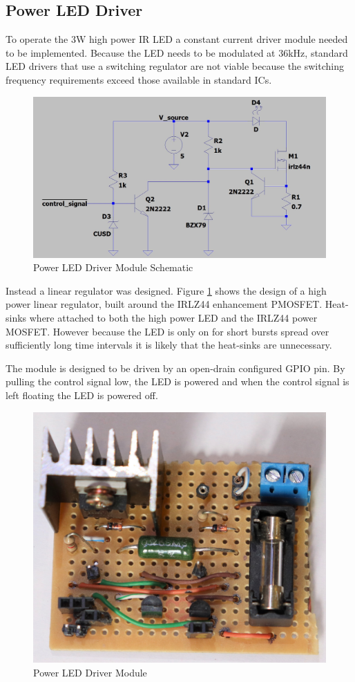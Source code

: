 \subsection{Power LED Driver}

To operate the 3W high power IR LED a constant current driver module needed to be implemented. Because the LED needs to be modulated at 36kHz, standard LED drivers that use a switching regulator are not viable because the switching frequency requirements exceed those available in standard ICs.

\begin{figure}[H]
	\centering
	\includegraphics[width=.8\textwidth]{figures/design/power_led_driver.JPG}
	\caption{Power LED Driver Module Schematic}
	\label{fig:schematic_power_led_driver}
\end{figure}

Instead a linear regulator was designed. Figure \ref{fig:schematic_power_led_driver} shows the design of a high power linear regulator, built around the IRLZ44 enhancement PMOSFET. Heat-sinks where attached to both the high power LED and the IRLZ44 power MOSFET. However because the LED is only on for short bursts spread over sufficiently long time intervals it is likely that the heat-sinks are unnecessary.

The module is designed to be driven by an open-drain configured GPIO pin. By pulling the control signal low, the LED is powered and when the control signal is left floating the LED is powered off.

\begin{figure}[H]
	\centering
	\includegraphics[width=.6\textwidth]{figures/modules/power_led_driver.jpg}
	\caption{Power LED Driver Module}
	\label{fig:module_power_led_driver}
\end{figure}

